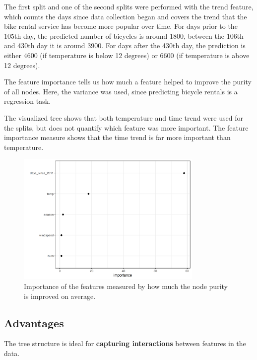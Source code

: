 \documentclass[
  10pt,
]{scrbook}
\begin{document}
The first split and one of the second splits were performed with the trend feature, which counts the days since data collection began and covers the trend that the bike rental service has become more popular over time.
For days prior to the 105th day, the predicted number of bicycles is around 1800, between the 106th and 430th day it is around 3900.
For days after the 430th day, the prediction is either 4600 (if temperature is below 12 degrees) or 6600 (if temperature is above 12 degrees).

The feature importance tells us how much a feature helped to improve the purity of all nodes.
Here, the variance was used, since predicting bicycle rentals is a regression task.

The visualized tree shows that both temperature and time trend were used for the splits, but does not quantify which feature was more important.
The feature importance measure shows that the time trend is far more important than temperature.

\begin{figure}

{\centering \includegraphics[width=0.8\textwidth]{images/tree-importance-1} 

}

\caption{Importance of the features measured by how much the node purity is improved on average.}\label{fig:tree-importance}
\end{figure}

\hypertarget{advantages-2}{%
\subsection{Advantages}\label{advantages-2}}

The tree structure is ideal for \textbf{capturing interactions} between features in the data.
\end{document}
